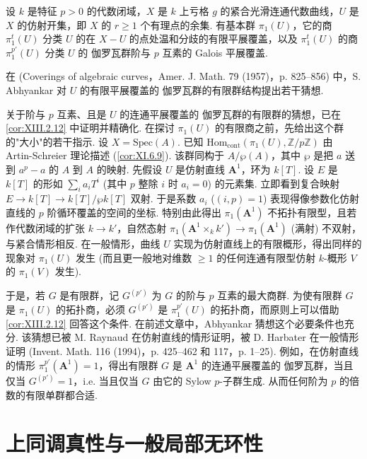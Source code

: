 \begin{remark}[2003 年 (MR) 增补]
设 $k$ 是特征 $p > 0$ 的代数闭域，$X$ 是 $k$ 上亏格 $g$ 的紧合光滑连通代数曲线，$U$ 是 $X$ 的仿射开集，即 $X$ 的 $r \geqslant 1$ 个有理点的余集. 有基本群 $\pi_1(U)$，它的商 $\pi^t_1(U)$ 分类 $U$ 的在 $X - U$ 的点处温和分歧的有限平展覆盖，以及 $\pi^t_1(U)$ 的商 $\pi^{p'}_1(U)$ 分类 $U$ 的 伽罗瓦群阶与 $p$ 互素的 Galois 平展覆盖.

在 (Coverings of algebraic curves，Amer. J. Math. 79 (1957)，p. 825--856) 中，S. Abhyankar 对 $U$ 的有限平展覆盖的 伽罗瓦群的有限群结构提出若干猜想.

关于阶与 $p$ 互素、且是 $U$ 的连通平展覆盖的 伽罗瓦群的有限群的猜想，已在\cref{cor:XIII.2.12} 中证明并精确化. 在探讨 $\pi_1(U)$ 的有限商之前，先给出这个群的"大小"的若干指示. 设 $X = \mathrm{Spec}(A)$. 已知 $\mathrm{Hom}_{\mathrm{cont}}(\pi_1(U), \mathbb{Z}/p\mathbb{Z})$ 由 Artin-Schreier 理论描述 (\cref{cor:XI.6.9}). 该群同构于 $A/\wp(A)$，其中 $\wp$ 是把 $a$ 送到 $a^p - a$ 的 $A$ 到 $A$ 的映射. 先假设 $U$ 是仿射直线 $\mathbf{A}^1$，环为 $k[T]$. 设 $E$ 是 $k[T]$ 的形如 $\sum_i a_i T^i$ (其中 $p$ 整除 $i$ 时 $a_i = 0$) 的元素集. 立即看到复合映射 $E \to k[T] \to k[T]/\wp k[T]$ 双射. 于是系数 $a_i$ ($(i, p) = 1$) 表现得像参数化仿射直线的 $p$ 阶循环覆盖的空间的坐标. 特别由此得出 $\pi_1(\mathbf{A}^1)$ 不拓扑有限型，且若作代数闭域的扩张 $k \to k'$，自然态射 $\pi_1(\mathbf{A}^1 \times_k k') \to \pi_1(\mathbf{A}^1)$ (满射) 不双射，与紧合情形相反. 在一般情形，曲线 $U$ 实现为仿射直线上的有限概形，得出同样的现象对 $\pi_1(U)$ 发生 (而且更一般地对维数 $\geqslant 1$ 的任何连通有限型仿射 $k$-概形 $V$ 的 $\pi_1(V)$ 发生).

于是，若 $G$ 是有限群，记 $G^{(p')}$ 为 $G$ 的阶与 $p$ 互素的最大商群. 为使有限群 $G$ 是 $\pi_1(U)$ 的拓扑商，必须 $G^{(p')}$ 是 $\pi^{p'}_1(U)$ 的拓扑商，而原则上可以借助\cref{cor:XIII.2.12} 回答这个条件. 在前述文章中，Abhyankar 猜想这个必要条件也充分. 该猜想已被 M. Raynaud 在仿射直线的情形证明，被 D. Harbater 在一般情形证明 (Invent. Math. 116 (1994)，p. 425--462 和 117，p. 1--25). 例如，在仿射直线的情形 $\pi^{p'}_1(\mathbf{A}^1) = 1$，得出有限群 $G$ 是 $\mathbf{A}^1$ 的连通平展覆盖的 伽罗瓦群，当且仅当 $G^{(p')} = 1$，i.e. 当且仅当 $G$ 由它的 Sylow $p$-子群生成. 从而任何阶为 $p$ 的倍数的有限单群都合适.
\end{remark}

\section{上同调真性与一般局部无环性}

